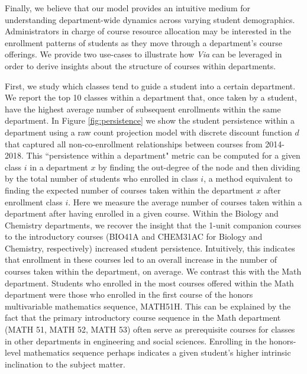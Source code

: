 \documentclass{sigchi}
\begin{document}
Finally, we believe that our model provides an intuitive medium for understanding department-wide dynamics across varying student demographics. Administrators in charge of course resource allocation may be interested in the enrollment patterns of students as they move through a department's course offerings. We provide two use-cases to illustrate how \textit{Via} can be leveraged in order to derive insights about the structure of courses within departments.

First, we study which classes tend to guide a student into a certain department. We report the top 10 classes within a department that, once taken by a student, have the highest average number of subsequent enrollments within the same department. In Figure \ref{fig:persistence} we show the student persistence within a department using a raw count projection model with discrete discount function $d$ that captured all non-co-enrollment relationships between courses from 2014-2018.  This ``persistence within a department" metric can be computed for a given class $i$ in a department $x$ by finding the out-degree of the node and then dividing by the total number of students who enrolled in class $i$, a method equivalent to finding the expected number of courses taken within the department $x$ after enrollment class $i$. Here we measure the average number of courses taken within a department after having enrolled in a given course. Within the Biology and Chemistry departments, we recover the insight that the 1-unit companion courses to the introductory courses (BIO41A and CHEM31AC for Biology and Chemistry, respectively) increased student persistence. Intuitively, this indicates that enrollment in these courses led to an overall increase in the number of courses taken within the department, on average. We contrast this with the Math department. Students who enrolled in the most courses offered within the Math department were those who enrolled in the first course of the honors multivariable mathematics sequence, MATH51H. This can be explained by the fact that the primary introductory course sequence in the Math department (MATH 51, MATH 52, MATH 53) often serve as prerequisite courses for classes in other departments in engineering and social sciences. Enrolling in the honors-level mathematics sequence perhaps indicates a given student's higher intrinsic inclination to the subject matter.
\end{document}

